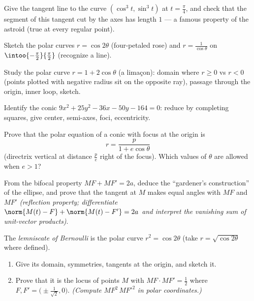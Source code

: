 \begin{exercise}[$\star$]\label{exo:b1:curves:3}
Give the tangent line to the curve $(\cos^3 t, \sin^3 t)$ at $t =
\frac\pi4$, and check that the segment of this tangent cut by the
axes has length $1$ --- a famous property of the astroid (true at
every regular point).
\end{exercise}

\begin{exercise}[$\star$]\label{exo:b1:curves:4}
Sketch the polar curves $r = \cos 2\theta$ (four-petaled rose) and
$r = \frac{1}{\cos\theta}$ on $\intoo{-\frac\pi2}{\frac\pi2}$
(recognize a line).
\end{exercise}

\begin{exercise}[$\star\star$]\label{exo:b1:curves:5}
Study the polar curve $r = 1 + 2\cos\theta$ (a lima\c{c}on): domain
where $r \geq 0$ vs $r < 0$ (points plotted with negative radius
sit on the opposite ray), passage through the origin, inner loop,
sketch.
\end{exercise}

\begin{exercise}[$\star\star$]\label{exo:b1:curves:6}
Identify the conic $9x^2 + 25y^2 - 36x - 50y - 164 = 0$: reduce by
completing squares, give center, semi-axes, foci, eccentricity.
\end{exercise}

\begin{exercise}[$\star\star$]\label{exo:b1:curves:7}
Prove that the polar equation of a conic with focus at the origin
is
\[
r = \frac{p}{1 + e\cos\theta}
\]
(directrix vertical at distance $\frac pe$ right of the focus).
Which values of $\theta$ are allowed when $e > 1$?
\end{exercise}

\begin{exercise}[$\star\star$]\label{exo:b1:curves:8}
From the bifocal property $MF + MF' = 2a$, deduce the ``gardener's
construction'' of the ellipse, and prove that the tangent at $M$
makes equal angles with $MF$ and $MF'$ \emph{(reflection property;
differentiate $\norm{M(t) - F} + \norm{M(t) - F'} = 2a$ and
interpret the vanishing sum of unit-vector products)}.
\end{exercise}

\begin{exercise}[$\star\star\star$]\label{exo:b1:curves:9}
The \emph{lemniscate of Bernoulli} is the polar curve $r^2 = \cos
2\theta$ (take $r = \sqrt{\cos2\theta}$ where defined).
\begin{enumerate}
  \item Give its domain, symmetries, tangents at the origin, and
        sketch it.
  \item Prove that it is the locus of points $M$ with $MF \cdot MF'
        = \frac12$ where $F, F' = \bigl(\pm\frac{1}{\sqrt2},
        0\bigr)$. \emph{(Compute $MF^2\,MF'^2$ in polar
        coordinates.)}
\end{enumerate}
\end{exercise}

